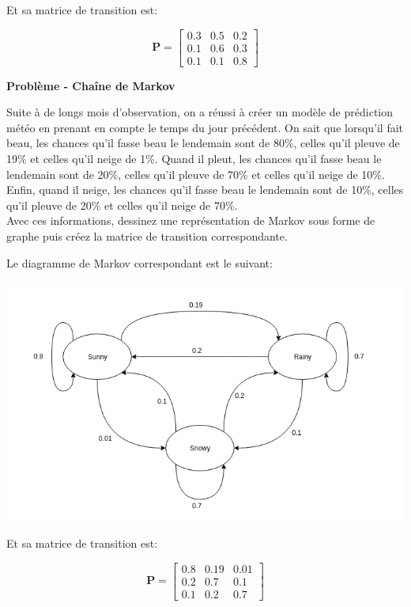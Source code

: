 \begin{Exercice}[5 minutes]
\begin{solution}
	Et sa matrice de transition est:

	\[ 
		\mathbf{P} =
		\begin{bmatrix}
		0.3 & 0.5 & 0.2 \\
		0.1 & 0.6 & 0.3 \\
		0.1 & 0.1 & 0.8
		\end{bmatrix}
	\]
	
    \end{solution}
\end{Exercice}

\begin{Exercice}[10 minutes]\textbf{Problème - Chaîne de Markov}

Suite à  de longs mois d’observation, on a réussi à créer un modèle de prédiction météo en prenant en compte le temps du jour précédent. On sait que lorsqu’il fait beau, les chances qu’il fasse beau le lendemain sont de 80\%, celles qu’il pleuve de 19\% et celles qu’il neige de 1\%. Quand il pleut, les chances qu’il fasse beau le lendemain sont de 20\%, celles qu’il pleuve de 70\% et celles qu’il neige de 10\%. Enfin, quand il neige, les chances qu’il fasse beau le lendemain sont de 10\%, celles qu’il pleuve de 20\% et celles qu’il neige de 70\%.\\
Avec ces informations, dessinez une représentation de Markov sous forme de graphe puis créez la matrice de transition correspondante.


    \begin{solution}
        Le diagramme de Markov correspondant est le suivant:

	    \centering
	    \includegraphics[width=.7\textwidth]{solutions/Etats_markov.png}
	
	Et sa matrice de transition est:

	\[ 
		\mathbf{P} =
		\begin{bmatrix}
		0.8 & 0.19 & 0.01 \\
		0.2 & 0.7 & 0.1 \\
		0.1 & 0.2 & 0.7
		\end{bmatrix}
	\]
	
    \end{solution}


\end{Exercice}


